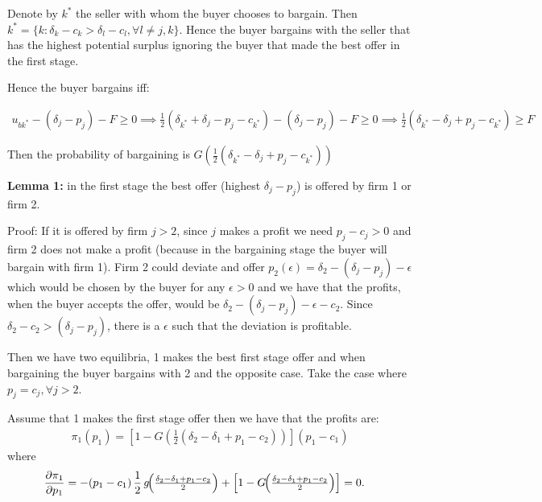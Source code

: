 \documentclass[12pt]{article}
\theoremstyle{plain}
\theoremstyle{plain}
\begin{document}
Denote by $k^*$ the seller with whom the buyer chooses to bargain. Then $k^* = \{k: \delta_k-c_k > \delta_l - c_l, \forall l\neq j, k \}$. Hence the buyer bargains with the seller that has the highest potential surplus ignoring the buyer that made the best offer in the first stage. 

Hence the buyer bargains iff: 

\begin{align*}
u_{bk^*} - (\delta_j - p_j) - F \geq 0 \implies
\frac{1}{2}(\delta_{k^*} + \delta_j - p_j - c_{k^*}) 
 - (\delta_j - p_j) - F \geq 0 \implies \frac{1}{2}(\delta_{k^*} - \delta_j +p_j - c_{k^*})  \geq F
\end{align*}

Then the probability of bargaining is  $G\left(\frac{1}{2}(\delta_{k^*} - \delta_j + p_j - c_{k^*}) \right)$

\textbf{Lemma 1:} in the first stage the best offer (highest $\delta_j - p_j$) is offered by firm 1 or firm 2. 

Proof: If it is offered by firm $j>2$, since $j$ makes a profit we need $ p_j -c_j >0 $ and firm 2 does not make a profit (because in the bargaining stage the buyer will bargain with firm 1). Firm 2 could deviate and offer $p_2(\epsilon) = \delta_2 - (\delta_j - p_j)  - \epsilon$ which would be chosen by the buyer for any $\epsilon>0$ and we have that the profits, when the buyer accepts the offer, would be $\delta_2 - (\delta_j - p_j)  - \epsilon -c_2 $. Since $\delta_2 - c_2>(\delta_j - p_j) $, there is a $\epsilon$ such that the deviation is profitable. 


\vspace{1cm}

Then we have two equilibria, 1 makes the best first stage offer and when bargaining the buyer bargains with 2 and the opposite case.
Take the case where $p_j = c_j, \forall j>2$. 


Assume that 1 makes the first stage offer then we have that the profits are: 
\begin{align}
    \pi_1(p_1) =\left[ 1-G\left(\frac{1}{2}(\delta_{2} - \delta_1 + p_1 - c_{2}) \right)\right](p_1 -c_1)
\end{align}
where 
\begin{align}
\frac{\partial \pi_1}{\partial p_1}
&= -(p_1 - c_1)\,\frac{1}{2}\,
   g\!\Bigl(\tfrac{\delta_2 - \delta_1 + p_1 - c_2}{2}\Bigr)
   + \Bigl[1 - G\!\Bigl(\tfrac{\delta_2 - \delta_1 + p_1 - c_2}{2}\Bigr)\Bigr]
   = 0.
\end{align}
\end{document}
